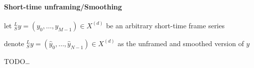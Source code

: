 \paragraph{Short-time unframing/Smoothing}
\begin{itemize*}
	\item let $^L_Sy=(y_0,\ldots,y_{M-1})\in X^{(d)}$ be an arbitrary short-time frame series
	\item denote $^L_S\hat y=(\hat y_0,\ldots,\hat y_{N-1})\in X^{(d)}$ as the unframed and smoothed version of $y$
	\item TODO\ldots
\end{itemize*}

